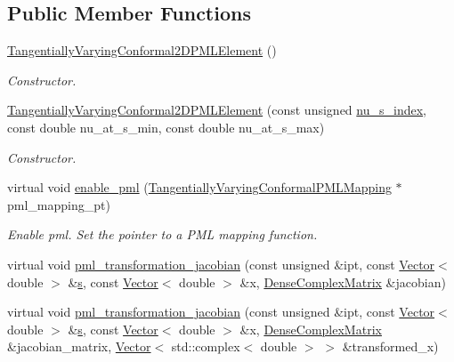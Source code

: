 \subsection*{Public Member Functions}
\begin{DoxyCompactItemize}
\item 
\hyperlink{classoomph_1_1TangentiallyVaryingConformal2DPMLElement_af5a81c47058e7456508994e6ea86fcf3}{Tangentially\+Varying\+Conformal2\+D\+P\+M\+L\+Element} ()
\begin{DoxyCompactList}\small\item\em Constructor. \end{DoxyCompactList}\item 
\hyperlink{classoomph_1_1TangentiallyVaryingConformal2DPMLElement_acf3f8264868e48e5b67ed35dc2ab077a}{Tangentially\+Varying\+Conformal2\+D\+P\+M\+L\+Element} (const unsigned \hyperlink{classoomph_1_1Conformal2DPMLElement_ac0fae35f94a70e615a8bbd47716a32d3}{nu\+\_\+s\+\_\+index}, const double nu\+\_\+at\+\_\+s\+\_\+min, const double nu\+\_\+at\+\_\+s\+\_\+max)
\begin{DoxyCompactList}\small\item\em Constructor. \end{DoxyCompactList}\item 
virtual void \hyperlink{classoomph_1_1TangentiallyVaryingConformal2DPMLElement_ac8b6cad9a9b917809dc3e5e60653bd7b}{enable\+\_\+pml} (\hyperlink{classoomph_1_1TangentiallyVaryingConformalPMLMapping}{Tangentially\+Varying\+Conformal\+P\+M\+L\+Mapping} $\ast$pml\+\_\+mapping\+\_\+pt)
\begin{DoxyCompactList}\small\item\em Enable pml. Set the pointer to a P\+ML mapping function. \end{DoxyCompactList}\item 
virtual void \hyperlink{classoomph_1_1TangentiallyVaryingConformal2DPMLElement_adcd024767abae57059b87fa19b1d489c}{pml\+\_\+transformation\+\_\+jacobian} (const unsigned \&ipt, const \hyperlink{classoomph_1_1Vector}{Vector}$<$ double $>$ \&\hyperlink{cfortran_8h_ab7123126e4885ef647dd9c6e3807a21c}{s}, const \hyperlink{classoomph_1_1Vector}{Vector}$<$ double $>$ \&x, \hyperlink{classoomph_1_1DenseComplexMatrix}{Dense\+Complex\+Matrix} \&jacobian)
\item 
virtual void \hyperlink{classoomph_1_1TangentiallyVaryingConformal2DPMLElement_a56a6af4af3774579d49d9dcc8c7e9bea}{pml\+\_\+transformation\+\_\+jacobian} (const unsigned \&ipt, const \hyperlink{classoomph_1_1Vector}{Vector}$<$ double $>$ \&\hyperlink{cfortran_8h_ab7123126e4885ef647dd9c6e3807a21c}{s}, const \hyperlink{classoomph_1_1Vector}{Vector}$<$ double $>$ \&x, \hyperlink{classoomph_1_1DenseComplexMatrix}{Dense\+Complex\+Matrix} \&jacobian\+\_\+matrix, \hyperlink{classoomph_1_1Vector}{Vector}$<$ std\+::complex$<$ double $>$ $>$ \&transformed\+\_\+x)

\end{DoxyCompactItemize}
